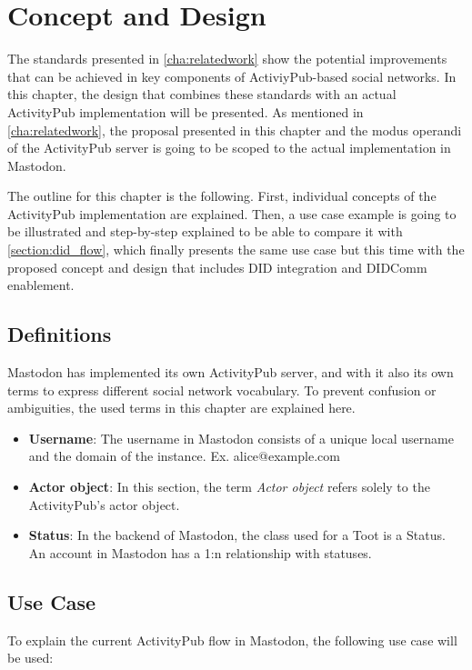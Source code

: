 \chapter{Concept and Design}
\label{cha:conceptanddesign}
 
The standards presented in \autoref{cha:relatedwork} show the potential improvements that can be achieved in key components of ActiviyPub-based social networks. In this chapter, the design that combines these standards with an actual ActivityPub implementation will be presented. As mentioned in \autoref{cha:relatedwork}, the proposal presented in this chapter and the modus operandi of the ActivityPub server is going to be scoped to the actual implementation in Mastodon.

The outline for this chapter is the following. First, individual concepts of the ActivityPub implementation are explained. Then, a use case example is going to be illustrated and step-by-step explained to be able to compare it with \autoref{section:did_flow}, which finally presents the same use case but this time with the proposed concept and design that includes DID integration and DIDComm enablement.
 
\section{Definitions}
Mastodon has implemented its own ActivityPub server, and with it also its own terms to express different social network vocabulary. To prevent confusion or ambiguities, the used terms in this chapter are explained here. 
 
\begin{itemize}
  \item \textbf{Username}: The username in Mastodon consists of a unique local username and the domain of the instance. Ex. alice@example.com
  \item \textbf{Actor object}: In this section, the term \emph{Actor object} refers solely to the ActivityPub's actor object. 
  \item \textbf{Status}: In the backend of Mastodon, the class used for a Toot is a Status. An account in Mastodon has a 1:n relationship with statuses.
\end{itemize}

\section{Use Case}\label{section:use_case}
To explain the current ActivityPub flow in Mastodon, the following use case will be used:

